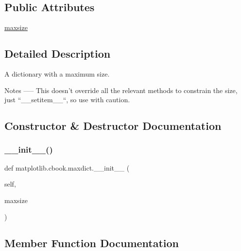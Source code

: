 \subsection*{Public Attributes}
\begin{DoxyCompactItemize}
\item 
\hyperlink{classmatplotlib_1_1cbook_1_1maxdict_aa4b1f94140adaf6e8833aca516b3e297}{maxsize}
\end{DoxyCompactItemize}


\subsection{Detailed Description}
\begin{DoxyVerb}A dictionary with a maximum size.

Notes
-----
This doesn't override all the relevant methods to constrain the size,
just ``__setitem__``, so use with caution.
\end{DoxyVerb}
 

\subsection{Constructor \& Destructor Documentation}
\mbox{\label{classmatplotlib_1_1cbook_1_1maxdict_aacb5a85ee341bce15bd2f381051e57d2}} 
\subsubsection{\texorpdfstring{\+\_\+\+\_\+init\+\_\+\+\_\+()}{\_\_init\_\_()}}
{\footnotesize\ttfamily def matplotlib.\+cbook.\+maxdict.\+\_\+\+\_\+init\+\_\+\+\_\+ (\begin{DoxyParamCaption}\item[{}]{self,  }\item[{}]{maxsize }\end{DoxyParamCaption})}



\subsection{Member Function Documentation}
\mbox{\label{classmatplotlib_1_1cbook_1_1maxdict_aabaea7e2e7cb78361365d3d9530af979}} 
